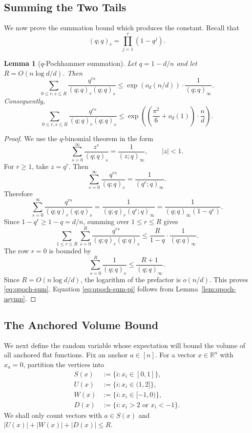 \documentclass[11pt]{article}
\newtheorem{lemma}[theorem]{Lemma}
\theoremstyle{definition}
\newcommand{\RR}{\mathbb{R}}
\begin{document}
\subsection{Summing the Two Tails}

We now prove the summation bound which produces the constant.  Recall that
\[
  (q;q)_r=\prod_{j=1}^r(1-q^j).
\]

\begin{lemma}[$q$-Pochhammer summation]\label{lem:qpoch-sum}
Let $q=1-d/n$ and let $R=O(n\log d/d)$.  Then
\begin{equation}\label{eq:qpoch-sum}
  \sum_{0\le r,s\le R}\frac{q^{rs}}{(q;q)_r(q;q)_s}
  \le \exp(o_d(n/d))\cdot\frac1{(q;q)_\infty}.
\end{equation}
Consequently,
\begin{equation}\label{eq:qpoch-sum-pi}
  \sum_{0\le r,s\le R}\frac{q^{rs}}{(q;q)_r(q;q)_s}
  \le \exp\left(\left(\frac{\pi^2}{6}+o_d(1)\right)\cdot\frac nd\right).
\end{equation}
\end{lemma}

\begin{proof}
We use the $q$-binomial theorem in the form
\begin{equation}\label{eq:q-binomial-theorem}
  \sum_{s=0}^\infty\frac{z^s}{(q;q)_s}=\frac1{(z;q)_\infty},
  \qquad |z|<1.
\end{equation}
For $r\ge1$, take $z=q^r$.  Then
\[
  \sum_{s=0}^\infty\frac{q^{rs}}{(q;q)_s}
  =\frac1{(q^r;q)_\infty}.
\]
Therefore
\[
  \sum_{s=0}^\infty\frac{q^{rs}}{(q;q)_r(q;q)_s}
  =\frac1{(q;q)_r(q^r;q)_\infty}
  =\frac1{(q;q)_\infty(1-q^r)}.
\]
Since $1-q^r\ge 1-q=d/n$, summing over $1\le r\le R$ gives
\[
  \sum_{1\le r\le R}\sum_{s=0}^R\frac{q^{rs}}{(q;q)_r(q;q)_s}
  \le \frac{R}{1-q}\cdot\frac1{(q;q)_\infty}.
\]
The row $r=0$ is bounded by
\[
  \sum_{s=0}^R\frac1{(q;q)_s}\le \frac{R+1}{(q;q)_\infty}.
\]
Since $R=O(n\log d/d)$, the logarithm of the prefactor is $o(n/d)$.  This proves \eqref{eq:qpoch-sum}.  Equation \eqref{eq:qpoch-sum-pi} follows from Lemma~\ref{lem:qpoch-asymp}.
\end{proof}

\subsection{The Anchored Volume Bound}

We next define the random variable whose expectation will bound the volume of all anchored flat functions.  Fix an anchor $a\in[n]$.  For a vector $x\in\RR^n$ with $x_a=0$, partition the vertices into
\begin{align*}
  S(x)&:=\{i:x_i\in[0,1]\},\\
  U(x)&:=\{i:x_i\in(1,2]\},\\
  W(x)&:=\{i:x_i\in[-1,0)\},\\
  D(x)&:=\{i:x_i>2\text{ or }x_i<-1\}.
\end{align*}
We shall only count vectors with $a\in S(x)$ and $|U(x)|+|W(x)|+|D(x)|\le R$.
\end{document}
